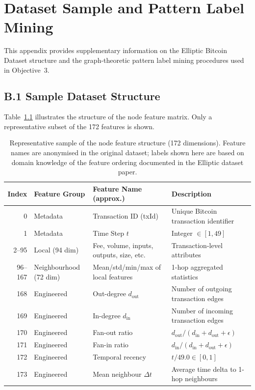 \chapter{Dataset Sample and Pattern Label Mining}
\label{AppendixB}

This appendix provides supplementary information on the Elliptic Bitcoin Dataset structure and the graph-theoretic pattern label mining procedures used in Objective~3.

\section*{B.1 Sample Dataset Structure}

Table~\ref{tab:sample_features} illustrates the structure of the node feature matrix. Only a representative subset of the 172 features is shown.

\begin{table}[!htbp]
\centering
\caption[Sample Node Feature Structure]{Representative sample of the node feature structure (172 dimensions). Feature names are anonymised in the original dataset; labels shown here are based on domain knowledge of the feature ordering documented in the Elliptic dataset paper.}
\label{tab:sample_features}
\begin{tabular}{|r|l|p{3.5cm}|p{5.0cm}|}
\hline
\textbf{Index} & \textbf{Feature Group} & \textbf{Feature Name (approx.)} & \textbf{Description} \\
\hline
0 & Metadata & Transaction ID (txId) & Unique Bitcoin transaction identifier \\
1 & Metadata & Time Step $t$ & Integer $\in [1, 49]$ \\
2--95 & Local (94 dim) & Fee, volume, inputs, outputs, size, etc. & Transaction-level attributes \\
96--167 & Neighbourhood (72 dim) & Mean/std/min/max of local features & 1-hop aggregated statistics \\
168 & Engineered & Out-degree $d_{\text{out}}$ & Number of outgoing transaction edges \\
169 & Engineered & In-degree $d_{\text{in}}$ & Number of incoming transaction edges \\
170 & Engineered & Fan-out ratio & $d_{\text{out}} / (d_{\text{in}} + d_{\text{out}} + \epsilon)$ \\
171 & Engineered & Fan-in ratio & $d_{\text{in}} / (d_{\text{in}} + d_{\text{out}} + \epsilon)$ \\
172 & Engineered & Temporal recency & $t / 49.0 \in [0, 1]$ \\
173 & Engineered & Mean neighbour $\Delta t$ & Average time delta to 1-hop neighbours \\
\hline
\end{tabular}
\end{table}

